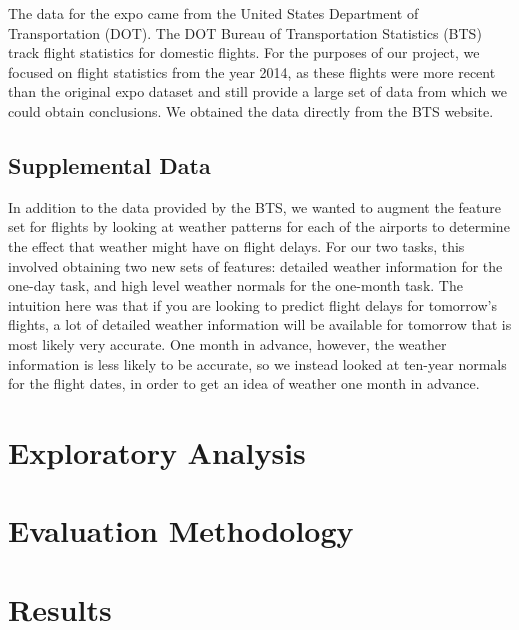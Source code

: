 \documentclass{article}
\begin{document}
The data for the expo came from the United States Department of Transportation (DOT). The DOT Bureau of Transportation Statistics (BTS) track flight statistics for domestic flights. For the purposes of our project, we focused on flight statistics from the year 2014, as these flights were more recent than the original expo dataset and still provide a large set of data from which we could obtain conclusions. We obtained the data directly from the BTS website.  

\subsection{Supplemental Data}

In addition to the data provided by the BTS, we wanted to augment the feature set for flights by looking at weather patterns for each of the airports to determine the effect that weather might have on flight delays. For our two tasks, this involved obtaining two new sets of features: detailed weather information for the one-day task, and high level weather normals for the one-month task. The intuition here was that if you are looking to predict flight delays for tomorrow's flights, a lot of detailed weather information will be available for tomorrow that is most likely very accurate. One month in advance, however, the weather information is less likely to be accurate, so we instead looked at ten-year normals for the flight dates, in order to get an idea of weather one month in advance.


\section{Exploratory Analysis}

\section{Evaluation Methodology}

\section{Results}
\end{document}

